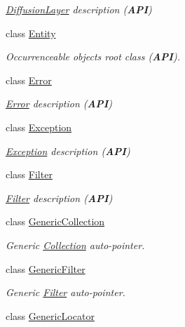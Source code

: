\begin{DoxyCompactItemize}
\begin{DoxyCompactList}\small\item\em \mbox{\hyperlink{classHurricane_1_1DiffusionLayer}{Diffusion\+Layer}} description ({\bfseries A\+PI}) \end{DoxyCompactList}\item 
class \mbox{\hyperlink{classHurricane_1_1Entity}{Entity}}
\begin{DoxyCompactList}\small\item\em Occurrenceable objects root class ({\bfseries A\+PI}). \end{DoxyCompactList}\item 
class \mbox{\hyperlink{classHurricane_1_1Error}{Error}}
\begin{DoxyCompactList}\small\item\em \mbox{\hyperlink{classHurricane_1_1Error}{Error}} description ({\bfseries A\+PI}) \end{DoxyCompactList}\item 
class \mbox{\hyperlink{classHurricane_1_1Exception}{Exception}}
\begin{DoxyCompactList}\small\item\em \mbox{\hyperlink{classHurricane_1_1Exception}{Exception}} description ({\bfseries A\+PI}) \end{DoxyCompactList}\item 
class \mbox{\hyperlink{classHurricane_1_1Filter}{Filter}}
\begin{DoxyCompactList}\small\item\em \mbox{\hyperlink{classHurricane_1_1Filter}{Filter}} description ({\bfseries A\+PI}) \end{DoxyCompactList}\item 
class \mbox{\hyperlink{classHurricane_1_1GenericCollection}{Generic\+Collection}}
\begin{DoxyCompactList}\small\item\em Generic \mbox{\hyperlink{classHurricane_1_1Collection}{Collection}} auto-\/pointer. \end{DoxyCompactList}\item 
class \mbox{\hyperlink{classHurricane_1_1GenericFilter}{Generic\+Filter}}
\begin{DoxyCompactList}\small\item\em Generic \mbox{\hyperlink{classHurricane_1_1Filter}{Filter}} auto-\/pointer. \end{DoxyCompactList}\item 
class \mbox{\hyperlink{classHurricane_1_1GenericLocator}{Generic\+Locator}}

\end{DoxyCompactItemize}
